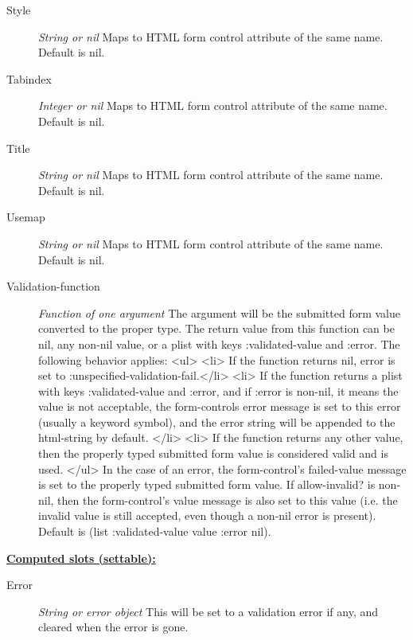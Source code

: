 \documentclass [11pt]{book}
\begin{document}
\begin{itemize}
\begin{description}
\item [Style]
\emph{String or nil} Maps to HTML form control attribute of the same name. Default is nil.


\item [Tabindex]
\emph{Integer or nil} Maps to HTML form control attribute of the same name. Default is nil.


\item [Title]
\emph{String or nil} Maps to HTML form control attribute of the same name. Default is nil.


\item [Usemap]
\emph{String or nil} Maps to HTML form control attribute of the same name. Default is nil.


\item [Validation-function]
\emph{Function of one argument} The argument will be the submitted form value converted to the proper type.
The return value from this function can be nil, any non-nil value, or a plist with keys :validated-value
and :error. The following behavior applies:
<ul>
<li> If the function returns nil, error is set to  :unspecified-validation-fail.</li>
<li> If the function returns a plist with keys :validated-value and :error, and if :error is non-nil,
it means the value is not acceptable, the form-controls error message is set to this error (usually a keyword symbol),
and the error string will be appended to the html-string by default. </li>
<li> If the function returns any other value, then the properly typed submitted form value is considered valid and is used.
</ul>
In the case of an error, the form-control's failed-value message is set to the properly typed submitted form value. If
allow-invalid? is non-nil, then the form-control's value message is also set to this value (i.e. the invalid value is
still accepted, even though a non-nil error is present).
Default is (list :validated-value value :error nil).


\end{description}






\textbf{
\underline{Computed slots (settable):}}

\begin{description}

\item [Error]
\emph{String or error object} This will be set to a validation error if any,
and cleared when the error is gone.



\end{description}
\end{itemize}
\end{document}
